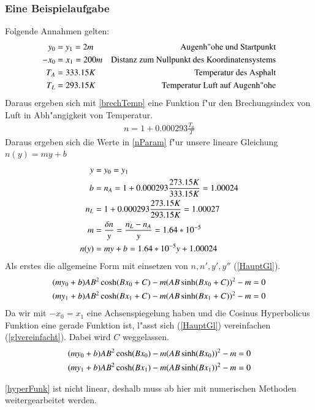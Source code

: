 \subsubsection{Eine Beispielaufgabe}
Folgende Annahmen gelten:
\begin{align}
	y_0&=y_1=2 m & \text{Augenh"ohe und Startpunkt} \notag \\
	-x_0&=x_1 = 200m & \text{Distanz zum Nullpunkt des Koordinatensystems} \notag \\
	T_A&=333.15 K & \text{Temperatur des Asphalt}  \notag \\
	T_L&=293.15 K & \text{Temperatur Luft auf Augenh"ohe}  \notag
\end{align}
Daraus ergeben sich mit \eqref{brechTemp} eine Funktion f"ur den
Brechungsindex von Luft in Abh"angigkeit von Temperatur.
\begin{align}
	n=1+0.000293\frac{T_0}{T}
	\label{brechTemp}
\end{align}
Daraus ergeben sich die Werte in \eqref{nParam} f"ur unsere lineare Gleichung
$n(y)=my+b$
\begin{align}
	y&=y_0=y_1 \notag \\
	b&=n_A=1+0.000293\frac{273.15 K}{333.15 K} = 1.00024 \notag \\
	n_L&=1+0.000293\frac{273.15 K}{293.15 K} = 1.00027 \notag \\
	m&=\frac{\delta n}{y}=\frac{n_L-n_A}{y}=1.64*10^{-5} \notag \\
	n(y)&=my+b=1.64*10^{-5}y +1.00024
	\label{nParam}
\end{align}
Als erstes die allgemeine Form mit einsetzen von $n,n',y',y''$
(\eqref{HauptGl}).
\begin{align}
	(my_0+b)A B^2 \cosh(B x_0 + C)-m (A B \sinh(B x_0 + C))^2-m &= 0\notag \\
	(my_1+b)A B^2 \cosh(B x_1 + C)-m (A B \sinh(B x_1 + C))^2-m &=0 \label{HauptGl}
\end{align}
Da wir mit $-x_0=x_1$ eine Achsenspiegelung haben und die Cosinus Hyperbolicus Funktion eine gerade Funktion ist, l"asst sich (\eqref{HauptGl}) vereinfachen (\eqref{glvereinfacht}). Dabei wird $C$ weggelassen.
\begin{align}
	(my_0+b)A B^2 \cosh(B x_0 )-m (A B \sinh(B x_0 ))^2-m &= 0\notag \\
	(my_1+b)A B^2 \cosh(B x_1 )-m (A B \sinh(B x_1 ))^2-m &=0 \label{glvereinfacht}
\end{align}

 \eqref{hyperFunk}
ist nicht linear, deshalb muss ab hier mit numerischen Methoden
weitergearbeitet werden.
 
